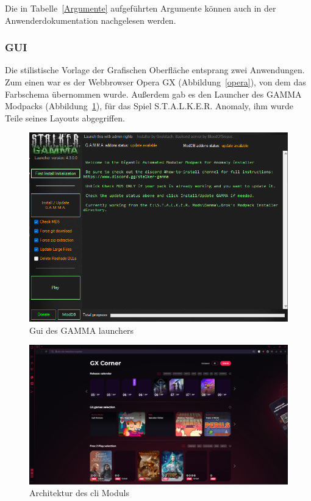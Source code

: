 \documentclass[stu, a4paper, 11pt, floatsintext]{apa7}
\begin{document}
\noindent Die in Tabelle~\ref{Argumente} aufgeführten Argumente können auch in der Anwenderdokumentation nachgelesen werden.

\subsubsection{GUI}
\noindent Die stilistische Vorlage der Grafischen Oberfläche entsprang zwei Anwendungen.
Zum einen war es der Webbrowser Opera GX (Abbildung~\ref{opera}), von dem das Farbschema übernommen wurde.
Außerdem gab es den Launcher des GAMMA Modpacks (Abbildung~\ref{gamma}), für das Spiel S.T.A.L.K.E.R. Anomaly, ihm wurde Teile seines Layouts abgegriffen.

\begin{figure}[!htbp]
\centering
\includegraphics[width=450px]{../technical_documentation/gui_sketches/inspiration/gamma.png}
\caption{\label{gamma}Gui des GAMMA launchers}
\end{figure}

\begin{figure}[!htbp]
\centering
\includegraphics[width=450px]{../technical_documentation/gui_sketches/inspiration/opera.png}
\caption{\label{gx}Architektur des cli Moduls}
\end{figure}
\end{document}
